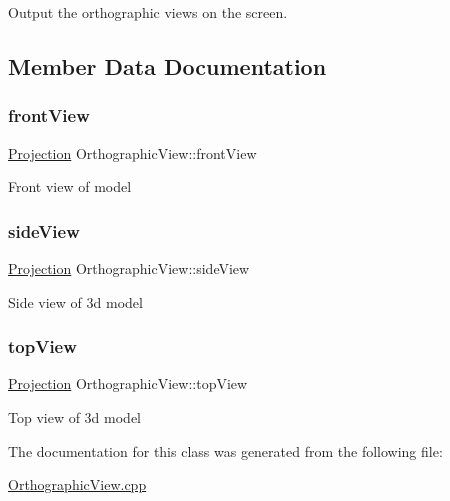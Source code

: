 Output the orthographic views on the screen. 

\subsection{Member Data Documentation}
\mbox{\label{class_orthographic_view_a6aef56f8180e166aba95c0de7f3715ec}} 
\subsubsection{\texorpdfstring{front\+View}{frontView}}
{\footnotesize\ttfamily \hyperlink{class_projection}{Projection} Orthographic\+View\+::front\+View}

Front view of model \mbox{\label{class_orthographic_view_a61767cc96527753531533d7ed581bab1}} 
\subsubsection{\texorpdfstring{side\+View}{sideView}}
{\footnotesize\ttfamily \hyperlink{class_projection}{Projection} Orthographic\+View\+::side\+View}

Side view of 3d model \mbox{\label{class_orthographic_view_a0107ef76f715dd00984ce9b30e80d9bd}} 
\subsubsection{\texorpdfstring{top\+View}{topView}}
{\footnotesize\ttfamily \hyperlink{class_projection}{Projection} Orthographic\+View\+::top\+View}

Top view of 3d model 

The documentation for this class was generated from the following file\+:\begin{DoxyCompactItemize}
\item 
\hyperlink{_orthographic_view_8cpp}{Orthographic\+View.\+cpp}\end{DoxyCompactItemize}
